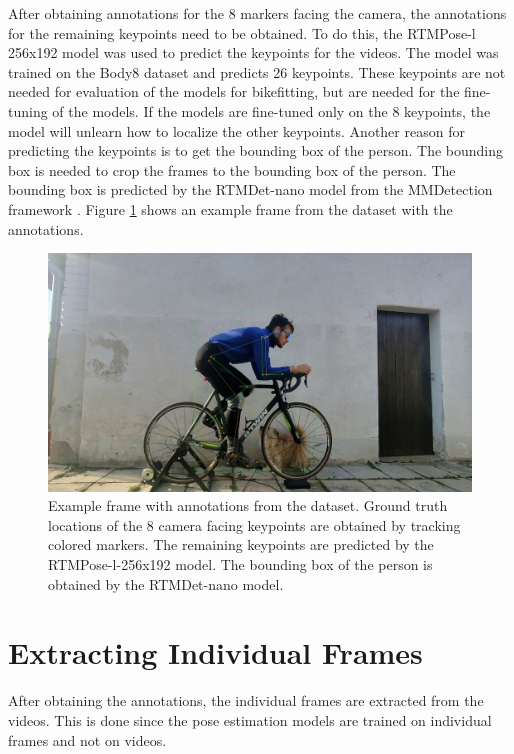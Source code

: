 After obtaining annotations for the 8 markers facing the camera, the annotations for the remaining keypoints need to be obtained. To do this, the RTMPose-l 256x192 model was used to predict the keypoints for the videos. The model was trained on the Body8 dataset and predicts 26 keypoints. These keypoints are not needed for evaluation of the models for bikefitting, but are needed for the fine-tuning of the models. If the models are fine-tuned only on the 8 keypoints, the model will unlearn how to localize the other keypoints. Another reason for predicting the keypoints is to get the bounding box of the person. The bounding box is needed to crop the frames to the bounding box of the person. The bounding box is predicted by the RTMDet-nano model \cite{rtmdet} from the MMDetection framework \cite{mmdetection}. Figure \ref{fig:dataset_annotations} shows an example frame from the dataset with the annotations.

\begin{figure}[htb]
    \centering
    \includegraphics[width=1\linewidth]{obrazky-figures/annotations_1.jpg}

    \caption{Example frame with annotations from the dataset. Ground truth locations of the 8 camera facing keypoints are obtained by tracking colored markers. The remaining keypoints are predicted by the RTMPose-l-256x192 model. The bounding box of the person is obtained by the RTMDet-nano model.}
    \label{fig:dataset_annotations}
\end{figure}



\section{Extracting Individual Frames}
After obtaining the annotations, the individual frames are extracted from the videos. This is done since the pose estimation models are trained on individual frames and not on videos.

